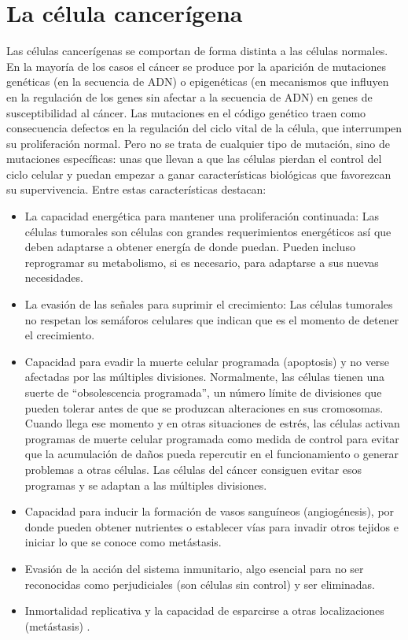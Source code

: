 \section{La célula cancerígena}
\hspace{.1cm}Las células cancerígenas se comportan de forma distinta a las células normales. En la mayoría de los casos el cáncer se produce por la aparición de mutaciones genéticas (en la secuencia de ADN) o epigenéticas (en mecanismos que influyen en la regulación de los genes sin afectar a la secuencia de ADN) en genes de susceptibilidad al cáncer. Las mutaciones en el código genético traen como consecuencia defectos en la regulación del ciclo vital de la célula, que interrumpen su proliferación normal. Pero no se trata de cualquier tipo de mutación, sino de mutaciones específicas: unas que llevan a que las células pierdan el control del ciclo celular y puedan empezar a ganar características biológicas que favorezcan su supervivencia.
Entre estas características destacan:
\begin{itemize}
    \item La capacidad energética para mantener una proliferación continuada: Las células tumorales son células con grandes requerimientos energéticos así que deben adaptarse a obtener energía de donde puedan. Pueden incluso reprogramar su metabolismo, si es necesario, para adaptarse a sus nuevas necesidades.
    \item La evasión de las señales para suprimir el crecimiento: Las células tumorales no respetan los semáforos celulares que indican que es el momento de detener el crecimiento.
    \item Capacidad para evadir la muerte celular programada (apoptosis) y no verse afectadas por las múltiples divisiones. Normalmente, las células tienen una suerte de ``obsolescencia programada'', un número límite de divisiones que pueden tolerar antes de que se produzcan alteraciones en sus cromosomas. Cuando llega ese momento y en otras situaciones de estrés, las células activan programas de muerte celular programada como medida de control para evitar que la acumulación de daños pueda repercutir en el funcionamiento o generar problemas a otras células. Las células del cáncer consiguen evitar esos programas y se adaptan a las múltiples divisiones.
    \item Capacidad para inducir la formación de vasos sanguíneos (angiogénesis), por donde pueden obtener nutrientes o establecer vías para invadir otros tejidos e iniciar lo que se conoce como metástasis.
    \item Evasión de la acción del sistema inmunitario, algo esencial para no ser reconocidas como perjudiciales (son células sin control) y ser eliminadas.
    \item Inmortalidad replicativa y la capacidad de esparcirse a otras localizaciones (metástasis) \cite{genotipia2024}.
\end{itemize}


